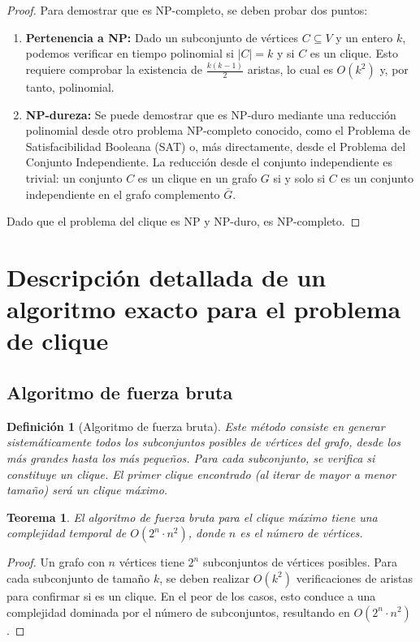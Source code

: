 \documentclass[12pt,a4paper]{report}
\newtheorem{definicion}{Definición}[chapter]
\newtheorem{teorema}{Teorema}[chapter]
\begin{document}
\begin{proof}
Para demostrar que es NP-completo, se deben probar dos puntos:
\begin{enumerate}
    \item \textbf{Pertenencia a NP:} Dado un subconjunto de vértices $C \subseteq V$ y un entero $k$, podemos verificar en tiempo polinomial si $|C| = k$ y si $C$ es un clique. Esto requiere comprobar la existencia de $\frac{k(k-1)}{2}$ aristas, lo cual es $O(k^2)$ y, por tanto, polinomial.
    \item \textbf{NP-dureza:} Se puede demostrar que es NP-duro mediante una reducción polinomial desde otro problema NP-completo conocido, como el Problema de Satisfacibilidad Booleana (SAT) o, más directamente, desde el Problema del Conjunto Independiente. La reducción desde el conjunto independiente es trivial: un conjunto $C$ es un clique en un grafo $G$ si y solo si $C$ es un conjunto independiente en el grafo complemento $\bar{G}$.
\end{enumerate}
Dado que el problema del clique es NP y NP-duro, es NP-completo.
\end{proof}

\section{Descripción detallada de un algoritmo exacto para el problema de clique}
\subsection{Algoritmo de fuerza bruta}
\begin{definicion}[Algoritmo de fuerza bruta]
Este método consiste en generar sistemáticamente todos los subconjuntos posibles de vértices del grafo, desde los más grandes hasta los más pequeños. Para cada subconjunto, se verifica si constituye un clique. El primer clique encontrado (al iterar de mayor a menor tamaño) será un clique máximo.
\end{definicion}

\begin{teorema}
El algoritmo de fuerza bruta para el clique máximo tiene una complejidad temporal de $O(2^n \cdot n^2)$, donde $n$ es el número de vértices.
\end{teorema}

\begin{proof}
Un grafo con $n$ vértices tiene $2^n$ subconjuntos de vértices posibles. Para cada subconjunto de tamaño $k$, se deben realizar $O(k^2)$ verificaciones de aristas para confirmar si es un clique. En el peor de los casos, esto conduce a una complejidad dominada por el número de subconjuntos, resultando en $O(2^n \cdot n^2)$.
\end{proof}
\end{document}
